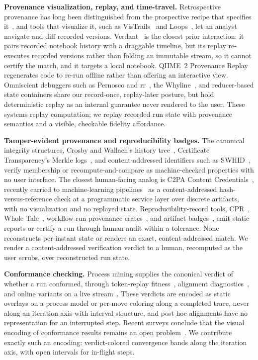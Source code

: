 \textbf{Provenance visualization, replay, and time-travel.}
Retrospective provenance has long been distinguished from the prospective recipe
that specifies it~\cite{lim2010}, and tools that visualize it, such as
VisTrails~\cite{vistrails2006} and Loops~\cite{loops2024}, let an analyst
navigate and diff recorded versions. Verdant~\cite{verdant2018, verdant2019} is
the closest prior interaction: it pairs recorded notebook history with a
draggable timeline, but its replay re-executes recorded versions rather than
folding an immutable stream, so it cannot certify the match, and it targets a
local notebook. QIIME~2 Provenance Replay~\cite{qiime2replay} regenerates code to
re-run offline rather than offering an interactive view. Omniscient debuggers
such as Pernosco and rr~\cite{rr2017}, the Whyline~\cite{whyline2008}, and
reducer-based state containers share our record-once, replay-later posture, but
hold deterministic replay as an internal guarantee never rendered to the user.
These systems replay computation; we replay recorded run state with provenance
semantics and a visible, checkable fidelity affordance.

\textbf{Tamper-evident provenance and reproducibility badges.}
The canonical integrity structures, Crosby and Wallach's history
tree~\cite{crosby2009}, Certificate Transparency's Merkle logs~\cite{ct2013}, and
content-addressed identifiers such as SWHID~\cite{swhid}, verify membership or
recompute-and-compare as machine-checked properties with no user interface. The
closest human-facing analog is C2PA Content Credentials~\cite{c2pa}, recently
carried to machine-learning pipelines~\cite{atlas2025} as a content-addressed
hash-versus-reference check at a programmatic service layer over discrete
artifacts, with no visualization and no replayed state. Reproducibility-record
tools, CPR~\cite{cpr2021}, Whole Tale~\cite{wholetale}, workflow-run provenance
crates~\cite{wrroc2024}, and artifact badges~\cite{acmbadges}, emit static
reports or certify a run through human audit within a tolerance. None
reconstructs per-instant state or renders an exact, content-addressed match. We
render a content-addressed verification verdict to a human, recomputed as the
user scrubs, over reconstructed run state.

\textbf{Conformance checking.}
Process mining supplies the canonical verdict of whether a run conformed, through
token-replay fitness~\cite{rozinat2008}, alignment diagnostics~\cite{berti2019,
pm4py}, and online variants on a live stream~\cite{vanzelst2019}. These verdicts
are encoded as static overlays on a process model or per-move coloring along a
completed trace, never along an iteration axis with interval structure, and
post-hoc alignments have no representation for an interrupted step. Recent
surveys conclude that the visual encoding of conformance results remains an open
problem~\cite{rehse2022, hagerehse2025}. We contribute exactly such an encoding:
verdict-colored convergence bands along the iteration axis, with open intervals
for in-flight steps.

